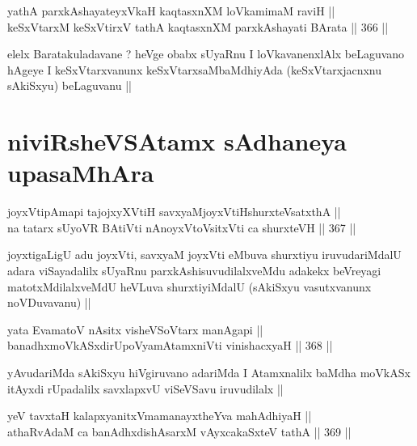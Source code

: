 
\begin{shl}
yathA parxkAshayateyxVkaH kaqtasxnXM loVkamimaM raviH || \\
keSxVtarxM keSxVtirxV tathA kaqtasxnXM parxkAshayati BArata ||  366 ||  
\end{shl}

\begin{artha}
elelx Baratakuladavane ? heVge obabx sUyaRnu I loVkavanenxlAlx
beLaguvano hAgeye I keSxVtarxvanunx keSxVtarxsaMbaMdhiyAda
(keSxVtarxjacnxnu sAkiSxyu) beLaguvanu ||
\end{artha}

\section*{niviRsheVSAtamx sAdhaneya upasaMhAra}


\begin{shl}
joyxVtipAmapi tajojxyXVtiH savxyaMjoyxVtiHshurxteVsatxthA || \\
na tatarx sUyoVR BAtiVti nAnoyxV\s toV\s sitxVti ca shurxteVH ||  367 ||  
\end{shl}

\begin{artha}
joyxtigaLigU adu joyxVti, savxyaM joyxVti eMbuva shurxtiyu
iruvudariMdalU adara viSayadalilx sUyaRnu parxkAshisuvudilalxveMdu
adakekx beVreyagi matotxMdilalxveMdU heVLuva shurxtiyiMdalU (sAkiSxyu
vasutxvanunx noVDuvavanu) ||
\end{artha}


\begin{shl}
yata EvamatoV nAsitx visheVSoV\s tarx manAgapi || \\
banadhxmoVkASxdirUpoV\s yamAtamxniVti vinishacxyaH ||  368 ||  
\end{shl}

\begin{artha}
yAvudariMda sAkiSxyu hiVgiruvano adariMda I Atamxnalilx baMdha moVkASx
itAyxdi rUpadalilx savxlapxvU viSeVSavu iruvudilalx ||
\end{artha}


\begin{shl}
yeV tavxtaH kalapxyanitxVmamanayxtheYva mahAdhiyaH || \\
athaRvAdaM ca banAdhxdishAsarxM vAyxcakaSxteV tathA ||  369 ||  
\end{shl}

